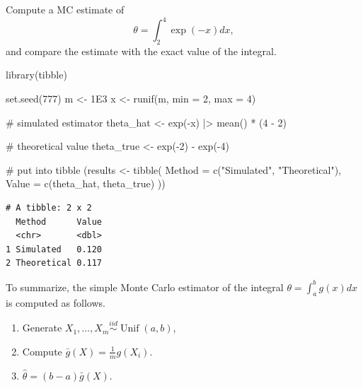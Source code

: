 \documentclass[
  letterpaper,
  DIV=11,
  numbers=noendperiod]{scrreprt}
\newenvironment{Shaded}{\begin{snugshade}}{\end{snugshade}}
\newcommand{\AttributeTok}[1]{\textcolor[rgb]{0.40,0.45,0.13}{#1}}
\newcommand{\CommentTok}[1]{\textcolor[rgb]{0.37,0.37,0.37}{#1}}
\newcommand{\DecValTok}[1]{\textcolor[rgb]{0.68,0.00,0.00}{#1}}
\newcommand{\FloatTok}[1]{\textcolor[rgb]{0.68,0.00,0.00}{#1}}
\newcommand{\FunctionTok}[1]{\textcolor[rgb]{0.28,0.35,0.67}{#1}}
\newcommand{\NormalTok}[1]{\textcolor[rgb]{0.00,0.23,0.31}{#1}}
\newcommand{\OtherTok}[1]{\textcolor[rgb]{0.00,0.23,0.31}{#1}}
\newcommand{\SpecialCharTok}[1]{\textcolor[rgb]{0.37,0.37,0.37}{#1}}
\newcommand{\StringTok}[1]{\textcolor[rgb]{0.13,0.47,0.30}{#1}}
\begin{document}
Compute a MC estimate of \[
\theta = \int_2^4 \exp(-x)dx,
\] and compare the estimate with the exact value of the integral.

\begin{Shaded}
\begin{Highlighting}[]
\FunctionTok{library}\NormalTok{(tibble)}

\FunctionTok{set.seed}\NormalTok{(}\DecValTok{777}\NormalTok{)}
\NormalTok{m }\OtherTok{\textless{}{-}} \FloatTok{1E3}
\NormalTok{x }\OtherTok{\textless{}{-}} \FunctionTok{runif}\NormalTok{(m, }\AttributeTok{min =} \DecValTok{2}\NormalTok{, }\AttributeTok{max =} \DecValTok{4}\NormalTok{)}

\CommentTok{\# simulated estimator}
\NormalTok{theta\_hat }\OtherTok{\textless{}{-}} \FunctionTok{exp}\NormalTok{(}\SpecialCharTok{{-}}\NormalTok{x) }\SpecialCharTok{|\textgreater{}} \FunctionTok{mean}\NormalTok{() }\SpecialCharTok{*}\NormalTok{ (}\DecValTok{4} \SpecialCharTok{{-}} \DecValTok{2}\NormalTok{)}

\CommentTok{\# theoretical value}
\NormalTok{theta\_true }\OtherTok{\textless{}{-}} \FunctionTok{exp}\NormalTok{(}\SpecialCharTok{{-}}\DecValTok{2}\NormalTok{) }\SpecialCharTok{{-}} \FunctionTok{exp}\NormalTok{(}\SpecialCharTok{{-}}\DecValTok{4}\NormalTok{)}

\CommentTok{\# put into tibble}
\NormalTok{(results }\OtherTok{\textless{}{-}} \FunctionTok{tibble}\NormalTok{(}
  \AttributeTok{Method =} \FunctionTok{c}\NormalTok{(}\StringTok{"Simulated"}\NormalTok{, }\StringTok{"Theoretical"}\NormalTok{),}
  \AttributeTok{Value  =} \FunctionTok{c}\NormalTok{(theta\_hat, theta\_true)}
\NormalTok{))}
\end{Highlighting}
\end{Shaded}

\begin{verbatim}
# A tibble: 2 x 2
  Method      Value
  <chr>       <dbl>
1 Simulated   0.120
2 Theoretical 0.117
\end{verbatim}

To summarize, the simple Monte Carlo estimator of the integral
\(\theta = \int_a^b g(x)dx\) is computed as follows.

\begin{enumerate}
\def\labelenumi{\arabic{enumi}.}
\item
  Generate
  \(X_1, \dots , X_m\overset{iid}{\sim}\operatorname{Unif}(a,b)\),
\item
  Compute \(\bar{g}(X) = \frac{1}{m} g(X_i)\).
\item
  \(\hat{\theta}= (b − a)\bar{g}(X)\).
\end{enumerate}
\end{document}
